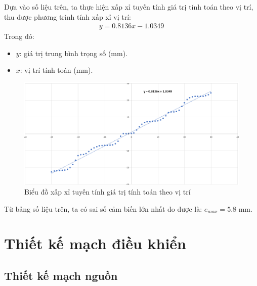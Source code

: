             \hspace*{0.6cm}Dựa vào số liệu trên, ta thực hiện xấp xỉ tuyến tính giá trị tính toán theo vị trí, thu được phương trình tính xấp xỉ vị trí:
            \begin{align}
                y = 0.8136x - 1.0349
                \label{eq:4-8}
            \end{align}
            Trong đó:
            \begin{itemize}
                \item $y$: giá trị trung bình trọng số (mm).
                \item $x$: vị trí tính toán (mm).
            \end{itemize}
            \begin{figure}[H]
                \centering
                \includegraphics[width=1\textwidth]{pictures/chapter4/c4_p15_LinearRegression.png}
                \caption{Biểu đồ xấp xỉ tuyến tính giá trị tính toán theo vị trí}
                \label{fig:4-8}
            \end{figure}
            \hspace*{0.6cm}Từ bảng số liệu trên, ta có sai số cảm biến lớn nhất đo được là: $e_{max} = 5.8$ mm. \\
    \section{Thiết kế mạch điều khiển} 
        \subsection{Thiết kế mạch nguồn}
